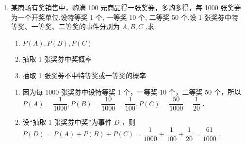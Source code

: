 \begin{enumerate}
\begin{enumerate}
\begin{jieda}
\begin{enumerate}
                ${B}_{1}$ 包含 $\left( {1,2}\right) ,\left( {2,1}\right)$ 两个样本点, $\therefore P\left( {B}_{1}\right)  = \dfrac{2}{25}$ ;
                
                ${B}_{3}$ 包含 $\left( {1,1}\right) ,\left( {1,3}\right) ,\left( {1,5}\right) ,\left( {2,2}\right) ,\left( {2,4}\right) ,\left( {3,1}\right) ,\left( {3,3}\right) ,\left( {3,5}\right) ,\left( {4,2}\right) ,\left( {4,4}\right) ,\left( {5,1}\right) ,\left( {5,3}\right)$ 12个样本点，($\left( {5,5}\right)$在 ${B}_{2}$ 中已经记录,不再计算)，$\therefore P\left( {B}_{3}\right)  = \dfrac{12}{25}$
                
                所以规则二获奖的概率
                
                $P\left( {{B}_{1} \cup {B}_{2} \cup {B}_{3}}\right)  = P\left( {B}_{1}\right)  + P\left( {B}_{2}\right)  + P\left( {B}_{3}\right)  = \dfrac{2}{25} + \dfrac{1}{5} + \dfrac{12}{25} = \dfrac{19}{25}$
            \end{enumerate}
        \end{jieda}
        
        \item 某商场有奖销售中，购满 100 元商品得一张奖券，多购多得，每 1000 张奖券为一个开奖单位.设特等奖 1 个, 一等奖 10 个, 二等奖 50 个.设 1 张奖券中特等奖、一等奖、二等奖的事件分别为 $A,B,C$ ,求:
        \begin{enumerate}
            \item $P\left( A\right) ,P\left( B\right) ,P\left( C\right)$
            \item 抽取 1 张奖券中奖概率
            \item 抽取 1 张奖券不中特等奖或一等奖的概率
        \end{enumerate}
        \begin{jieda}
            \begin{enumerate}
                \item 因为每 1000 张奖券中设特等奖 1 个，一等奖 10 个，二等奖 50 个，所以 $P\left( A\right)  = \dfrac{1}{1000},P\left( B\right)  = \dfrac{10}{1000} = \dfrac{1}{100},P\left( C\right)  = \dfrac{50}{1000} = \dfrac{1}{20}$ .

                \item 设“抽取 1 张奖券中奖”为事件 $D$ ，则 $P\left( D\right)  = P\left( A\right)  + P\left( B\right)  + P\left( C\right)  = \dfrac{1}{1000} + \dfrac{1}{100} + \dfrac{1}{20} = \dfrac{61}{1000}$ .


\end{enumerate}
\end{jieda}
\end{enumerate}
\end{enumerate}
